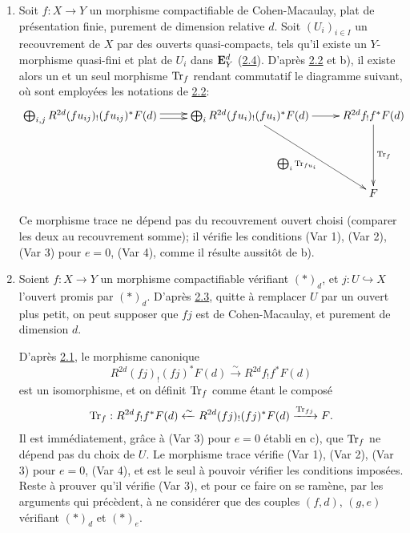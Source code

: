 \documentclass[10pt]{../fichiers-configuration-latex/smfart}
\begin{document}
\begin{enumerate}
On désignera par $\Tr_{f}$ le morphisme $t(f,u)$ construit plus
haut. D'après , ce morphisme trace vérifie (Var 1), (Var 2),
(Var 3) pour $e=0$, et (Var 4). Quand il est défini, il coïncide
nécessairement avec le morphisme trace cherché, si ce dernier existe.

\item Soit $f:X\rightarrow Y$ un morphisme compactifiable de
Cohen-Macaulay, plat de présentation finie, purement de dimension
relative $d$. Soit $(U_{i})_{i\in I}$ un recouvrement de $X$ par des
ouverts quasi-compacts, tels qu'il existe un $Y$-morphisme quasi-fini
et plat de $U_{i}$ dans $\mathbf{E}^{d}_{Y}$ (\hyperref[XVIII.lem2.4]{2.4}). D'après
\hyperref[XVIII.lem2.2]{2.2} et b), il 
existe alors un et un seul morphisme $\Tr_{f}$ rendant commutatif le
diagramme suivant, où sont employées les notations de \hyperref[XVIII.lem2.2]{2.2}:
$$
\xymatrix{
\bigoplus_{i,j}
R^{2d}(fu_{ij})_!(fu_{ij})^{\ast} F(d) \ar@<2pt>[r]
\ar@<-2pt>[r]&\bigoplus_{i}
R^{2d}(fu_i)_!(fu_i)^{\ast}F(d)
\ar[rdd]_{\bigoplus_{i}\Tr_{fu_i}}\ar[r]
& 
R^{2d}f_!f^{\ast}F(d) \ar[dd]^{\Tr_f}\\
& & \\
& & F
}
$$

Ce morphisme trace ne dépend pas du recouvrement ouvert choisi
(comparer les deux au recouvrement somme); il vérifie les conditions
(Var 1), (Var 2), (Var 3) pour $e=0$, (Var 4), comme il résulte
aussitôt de b).

\item Soient $f:X\rightarrow Y$ un morphisme compactifiable vérifiant
$(\ast)_{d}$, et $j:U\hookrightarrow X$\pageoriginale l'ouvert promis
par $(\ast)_{d}$. D'après \hyperref[XVIII.lem2.3]{2.3}, quitte à remplacer $U$
par un ouvert plus petit, on peut supposer que $fj$ est de Cohen-Macaulay, et
purement de dimension $d$.

\noindent
D'après \hyperref[XVIII.lem2.1]{2.1}, le morphisme canonique
$$
R^{2d}(fj)_{!}(fj)^{\ast}F(d)\xrightarrow{\sim}
R^{2d}f_{!}f^{\ast}F(d)
$$
est un isomorphisme, et on définit $\Tr_{f}$ comme étant le composé
$$
\operatorname{Tr}_{f}:R^{2d}f_{!}f^{\ast}F(d)\xleftarrow{\sim}
R^{2d}(fj)_{!}(fj)^{\ast}F(d)\xrightarrow{\operatorname{Tr}_{fj}}F{}.
$$
Il est immédiatement, grâce à (Var 3) pour $e=0$ établi en c), que
$\Tr_{f}$ ne dépend pas du choix de $U$. Le morphisme trace vérifie
(Var 1), (Var 2), (Var 3) pour $e=0$, (Var 4), et est le seul à
pouvoir vérifier les conditions imposées. Reste à prouver qu'il
vérifie (Var 3), et pour ce faire on se ramène, par les arguments qui
précèdent, à ne considérer que des couples $(f,d)$, $(g,e)$ vérifiant
$(\ast)_{d}$ et $(\ast)_{e}$.


\end{enumerate}
\end{document}
